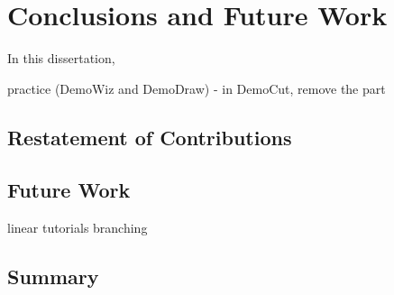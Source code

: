 \chapter{Conclusions and Future Work}
\label{chapter_conclusion}

In this dissertation,

practice (DemoWiz and DemoDraw) - in DemoCut, remove the part


\section{Restatement of Contributions}

\section{Future Work}

linear tutorials
branching

\section{Summary}
